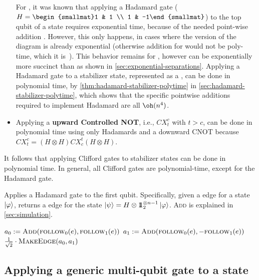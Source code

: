\begin{itemize}
    For \qmdds, it was known that applying a Hadamard gate ($H=\begin{smallmat}1 & 1 \\ 1 & -1\end{smallmat}$) to the top qubit of a state requires exponential time, because of the needed point-wise addition \cite[Table~2]{fargier2014knowledge}. However, this only happens, in cases where the \add version of the diagram is already exponential (otherwise addition for \adds would not be poly-time, which it is~\cite[Table~2]{fargier2014knowledge}).
    This behavior remains for \limdds, however \limdds can be exponentially more succinct than \qmdds as shown in \autoref{sec:exponential-separations}.
    Applying a Hadamard gate to a stabilizer state, represented as a \limdd, can be done in polynomial time, by \autoref{thm:hadamard-stabilizer-polytime} in \autoref{sec:hadamard-stabilizer-polytime}, which shows that the specific pointwise additions required to implement Hadamard are all $\oh(n^4)$.
\item Applying a \textbf{upward Controlled NOT}, i.e., $CX_t^c$ with $t>c$, can be done in polynomial time using only Hadamards and a downward CNOT because $CX_t^c = (H\otimes H) CX_c^t (H\otimes H)$.
\end{itemize}

It follows that applying Clifford gates to stabilizer states can be done in polynomial time.
In general, all Clifford gates are polynomial-time, except for the Hadamard gate.

\begin{algorithm}
	\caption{Applies a Hadamard gate to the first qubit. Specifically, given a \limdd edge for a state $\ket{\varphi}$, returns a \limdd edge for the state $\ket{\psi}=H\otimes 1\!\!1_2^{\otimes n-1}\ket{\varphi}$. \textsc{Add} is explained in \autoref{sec:simulation}.}
	\label{alg:apply-hadamard}
	\begin{algorithmic}[1]
			\State \Edge $a_0:=\textsc{Add}(\textsc{follow}_{0}(e),\textsc{follow}_{1}(e))$
			\State \Edge $a_1:=\textsc{Add}(\textsc{follow}_{0}(e),-\textsc{follow}_{1}(e))$
			\State \Return $\frac{1}{\sqrt 2}\cdot \textsc{MakeEdge}(a_0,a_1)$
		\EndProcedure
	\end{algorithmic}
\end{algorithm}

\subsection{Applying a generic multi-qubit gate to a state}
\label{sec:simulation}


